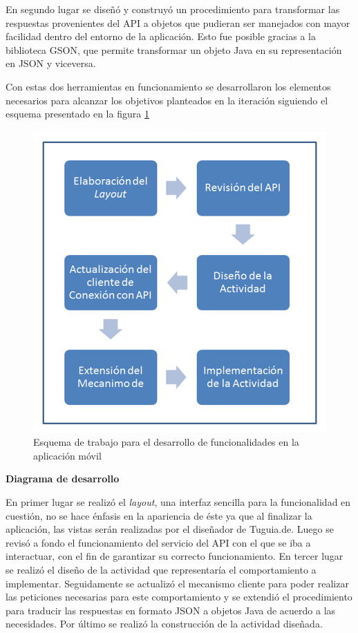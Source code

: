En segundo lugar se diseñó y construyó un procedimiento para transformar las respuestas provenientes del API a objetos que pudieran ser manejados con mayor facilidad dentro del entorno de la aplicación. Esto fue posible gracias a la biblioteca GSON, que permite transformar un objeto Java en su representación en JSON y viceversa.

Con estas dos herramientas en funcionamiento se desarrollaron los elementos necesarios para alcanzar los objetivos planteados en la iteración siguiendo el esquema presentado en la figura \ref{img:diagrama_flujo} 

\begin{figure}[h]
	\begin{center}
		\includegraphics[scale=0.4]{imagenes/diagrama.png}
	\end{center}
	\caption{
		\label{img:diagrama_flujo}
		Esquema de trabajo para el desarrollo de funcionalidades en la aplicación móvil
	}
\end{figure}

\textbf{Diagrama de desarrollo}

En primer lugar se realizó el \textit{layout}, una interfaz sencilla para la funcionalidad en cuestión, no se hace énfasis en la apariencia de éste ya que al finalizar la aplicación, las vistas serán realizadas por el diseñador de Tuguia.de. Luego se revisó a fondo el funcionamiento del servicio del API con el que se iba a interactuar, con el fin de garantizar su correcto funcionamiento. En tercer lugar se realizó el diseño de la actividad que representaría el comportamiento a implementar. Seguidamente se actualizó el mecanismo cliente para poder realizar las peticiones necesarias para este comportamiento y se extendió el procedimiento para traducir las respuestas en formato JSON a objetos Java de acuerdo a las necesidades. Por último se realizó la construcción de la actividad diseñada.

